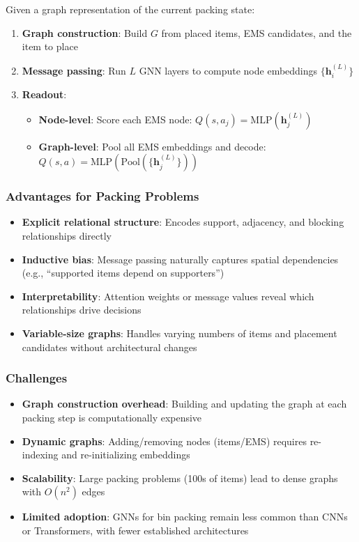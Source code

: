 Given a graph representation of the current packing state:

\begin{enumerate}
\item \textbf{Graph construction}: Build $G$ from placed items, EMS candidates, and the item to place
\item \textbf{Message passing}: Run $L$ GNN layers to compute node embeddings $\{\mathbf{h}_i^{(L)}\}$
\item \textbf{Readout}:
  \begin{itemize}
  \item \textbf{Node-level}: Score each EMS node: $Q(s, a_j) = \text{MLP}(\mathbf{h}_j^{(L)})$
  \item \textbf{Graph-level}: Pool all EMS embeddings and decode: $Q(s, a) = \text{MLP}(\text{Pool}(\{\mathbf{h}_j^{(L)}\}))$
  \end{itemize}
\end{enumerate}

\subsubsection{Advantages for Packing Problems}

\begin{itemize}
\item \textbf{Explicit relational structure}: Encodes support, adjacency, and blocking relationships directly
\item \textbf{Inductive bias}: Message passing naturally captures spatial dependencies (e.g., ``supported items depend on supporters'')
\item \textbf{Interpretability}: Attention weights or message values reveal which relationships drive decisions
\item \textbf{Variable-size graphs}: Handles varying numbers of items and placement candidates without architectural changes
\end{itemize}

\subsubsection{Challenges}

\begin{itemize}
\item \textbf{Graph construction overhead}: Building and updating the graph at each packing step is computationally expensive
\item \textbf{Dynamic graphs}: Adding/removing nodes (items/EMS) requires re-indexing and re-initializing embeddings
\item \textbf{Scalability}: Large packing problems (100s of items) lead to dense graphs with $O(n^2)$ edges
\item \textbf{Limited adoption}: GNNs for bin packing remain less common than CNNs or Transformers, with fewer established architectures
\end{itemize}



